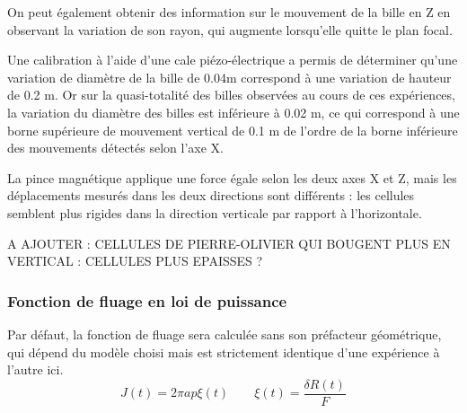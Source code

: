 On peut également obtenir des information sur le mouvement de la bille en Z en observant la variation de son rayon, qui augmente lorsqu'elle quitte le plan focal. 

Une calibration à l'aide d'une cale piézo-électrique a permis de déterminer qu'une variation de diamètre de la bille de 0.04\micro m correspond à une variation de hauteur de 0.2 \micro m. 
Or sur la quasi-totalité des billes observées au cours de ces expériences, la variation du diamètre des billes est inférieure à 0.02 \micro m, ce qui correspond à une borne supérieure de mouvement vertical de 0.1 \micro m de l'ordre de la borne inférieure des mouvements détectés selon l'axe X. 

La pince magnétique applique une force égale selon les deux axes X et Z, mais les déplacements mesurés dans les deux directions sont différents : les cellules semblent plus rigides dans la direction verticale par rapport à l'horizontale. 

A AJOUTER : CELLULES DE PIERRE-OLIVIER QUI BOUGENT PLUS EN VERTICAL : CELLULES PLUS EPAISSES ? 


\subsubsection{Fonction de fluage en loi de puissance}

Par défaut, la fonction de fluage sera calculée sans son préfacteur géométrique, qui dépend du modèle choisi mais est strictement identique d'une expérience à l'autre ici.
$$ J(t) = 2 \pi a p \xi (t)\qquad \xi (t) = \frac{\delta R (t)}{F}$$
	
